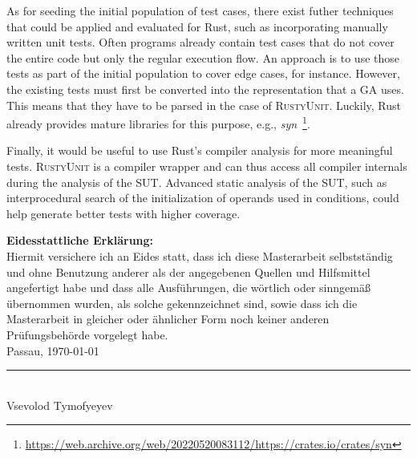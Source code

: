 \documentclass[paper=a4,%
  twoside,%
  BCOR4mm,%
  abstract=true,%
  toc=bibliography,%
  chapterprefix=true,%
  toc=bibliographynumbered,%
  open=right,%
  english,%
  pagesize=pdftex]{scrreprt}
\newcommand{\tech}{\textsc{RustyUnit}\xspace}
\newcommand{\sut}{\ac{SUT}\xspace}
\newcommand{\ga}{\ac{GA}\xspace}
\begin{document}
As for seeding the initial population of test cases, there exist futher techniques that could be applied and evaluated for Rust, such as incorporating manually written unit tests. Often programs already contain test cases that do not cover the entire code but only the regular execution flow. An approach is to use those tests as part of the initial population to cover edge cases, for instance. However, the existing tests must first be converted into the representation that a \ga uses. This means that they have to be parsed in the case of \tech. Luckily, Rust already provides mature libraries for this purpose, e.g., \emph{syn}~\footnote{\url{https://web.archive.org/web/20220520083112/https://crates.io/crates/syn}}.

Finally, it would be useful to use Rust's compiler analysis for more meaningful tests. \tech is a compiler wrapper and can thus access all compiler internals during the analysis of the \sut. Advanced static analysis of the \sut, such as interprocedural search of the initialization of operands used in conditions, could help generate better tests with higher coverage.


\backmatter%
\appendix
\cleardoublepage
\thispagestyle{empty}
\null\vfill
\noindent\textbf{Eidesstattliche Erklärung:}\\[1.5ex]
Hiermit versichere ich an Eides statt, dass ich diese Masterarbeit
selbstständig und ohne Benutzung anderer als der angegebenen Quellen und
Hilfsmittel angefertigt habe und dass alle Ausführungen, die wörtlich oder
sinngemäß übernommen wurden, als solche gekennzeichnet sind, sowie dass ich die
Masterarbeit in gleicher oder ähnlicher Form noch keiner anderen
Prüfungsbehörde vorgelegt habe.\\[1.5cm]
Passau, \today\quad\rule{6cm}{0.1mm}\\
\null\hspace{5cm} {\small Vsevolod Tymofyeyev}

\clearpage


\clearpage
\printbibliography
\end{document}
